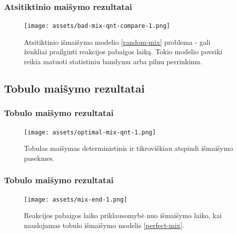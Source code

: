 \documentclass{beamer}
\begin{document}
\begin{frame}
    \frametitle{Atsitiktinio maišymo rezultatai}
    \begin{figure}
        \centering
        \texttt{[image: assets/bad-mix-qnt-compare-1.png]}
        \caption{Atsitiktinio išmaišymo modelio \eqref{random-mix} problema - gali ženkliai prailginti reakcijos pabaigos laiką. Tokio modelio poveiki reikia matuoti statistiniu bandymu arba pilnu perrinkimu. }
    \end{figure}
\end{frame}

\subsection{Tobulo maišymo rezultatai}
\begin{frame}
\frametitle{Tobulo maišymo rezultatai}
\begin{figure}
\centering
\texttt{[image: assets/optimal-mix-qnt-1.png]}
\caption{Tobulas maišymas deterministinis ir tikroviškiau atspindi išmaišymo pasekmes.}
\end{figure}
\end{frame}

\begin{frame}
    \frametitle{Tobulo maišymo rezultatai}
    \begin{figure}
        \centering
        \texttt{[image: assets/mix-end-1.png]}
        \caption{Reakcijos pabaigos laiko priklausomybė nuo išmaišymo laiko, kai naudojamas tobulo išmaišymo modelis \eqref{perfect-mix}.}
    \end{figure}
\end{frame}
\end{document}

